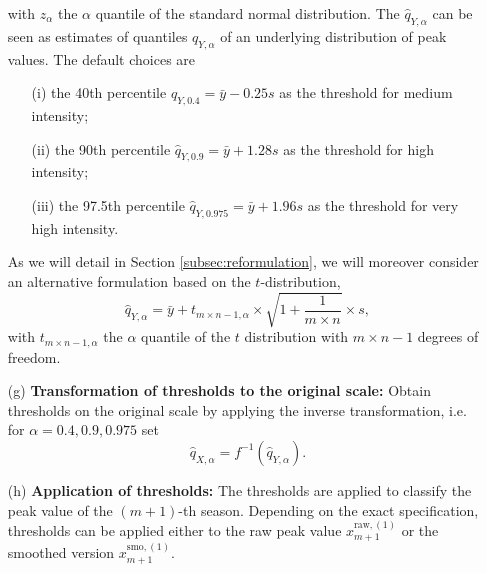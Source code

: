 \documentclass[12pt]{article}
\newcommand{\sd}{s}
\begin{document}
\begin{enumerate}
\begin{equation}
\end{equation}
with $z_\alpha$ the $\alpha$ quantile of the standard normal distribution. The $\hat{q}_{Y, \alpha}$ can be seen as estimates of quantiles $q_{Y, \alpha}$ of an underlying distribution of peak values. The default choices are
\begin{itemize}
\item[(i)] the 40th percentile $\hat{q}_{Y, 0.4} = \bar{y} - 0.25 \sd$ as the threshold for medium intensity;
\item[(ii)] the 90th percentile $\hat{q}_{Y, 0.9} = \bar{y} + 1.28 \sd$ as the threshold for high intensity;
\item[(iii)] the 97.5th percentile $\hat{q}_{Y, 0.975} = \bar{y} + 1.96\sd$ as the threshold for very high intensity.
\end{itemize}
As we will detail in Section \ref{subsec:reformulation}, we will moreover consider an alternative formulation based on the $t$-distribution,
\begin{equation}
\hat{q}_{Y, \alpha} = \bar{y} + t_{m\times n - 1, \alpha} \times \sqrt{1 + \frac{1}{m\times n}} \times s,
\label{eq:q_Y_t}
\end{equation}
with $t_{m\times n - 1, \alpha}$ the $\alpha$ quantile of the $t$ distribution with $m\times n - 1$ degrees of freedom.
\item[(g)] \textbf{Transformation of thresholds to the original scale:} Obtain thresholds on the original scale by applying the inverse transformation, i.e. for $\alpha = 0.4, 0.9, 0.975$ set%
$$
\hat{q}_{X, \alpha} = f^{-1}(\hat{q}_{Y, \alpha}).
$$
\item[(h)] \textbf{Application of thresholds:} The thresholds are applied to classify the peak value of the $(m + 1)$-th season. Depending on the exact specification, thresholds can be applied either to the raw peak value $x_{m + 1}^{\text{raw}, (1)}$ or the smoothed version $x_{m + 1}^{\text{smo}, (1)}$.
\end{enumerate}
\end{document}
